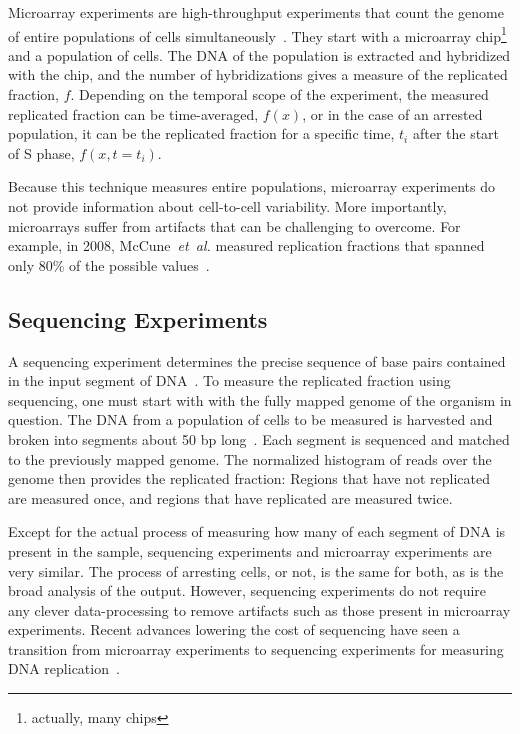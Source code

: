 		Microarray experiments are high-throughput experiments that count the genome of entire populations of cells simultaneously~\cite{MicroarrayReview}.
		They start with a microarray chip\footnote{actually, many chips} and a population of cells.
		The DNA of the population is extracted and hybridized with the chip, and the number of hybridizations gives a measure of the replicated fraction, $f$.
		Depending on the temporal scope of the experiment, the measured replicated fraction can be time-averaged, $f(x)$, or in the case of an arrested population, it can be the replicated fraction for a specific time, $t_i$ after the start of S phase, $f(x,t=t_i)$.
		
		Because this technique measures entire populations, microarray experiments do not provide information about cell-to-cell variability.
		More importantly, microarrays suffer from artifacts that can be challenging to overcome.
		For example, in 2008, McCune~\emph{et~al.} measured replication fractions that spanned only 80\% of the possible values~\cite{McCuneMicroArray}.
		
		
		\subsection{Sequencing Experiments}
		\label{subsec:Sequencing}
		
		A sequencing experiment determines the precise sequence of base pairs contained in the input segment of DNA~\cite{SequencingReview}.
		To measure the replicated fraction using sequencing, one must start with with the fully mapped genome of the organism in question.
		The DNA from a population of cells to be measured is harvested and broken into segments about 50 bp long~\cite{StochasticTermination}.
		Each segment is sequenced and matched to the previously mapped genome.
		The normalized histogram of reads over the genome then provides the replicated fraction:
		Regions that have not replicated are measured once, and regions that have replicated are measured twice.
		
		Except for the actual process of measuring how many of each segment of DNA is present in the sample, sequencing experiments and microarray experiments are very similar.
		The process of arresting cells, or not, is the same for both, as is the broad analysis of the output.
		However, sequencing experiments do not require any clever data-processing to remove artifacts such as those present in microarray experiments.
		Recent advances lowering the cost of sequencing have seen a transition from microarray experiments to sequencing experiments for measuring DNA replication~\cite{EndOfMicroarray}.
		
